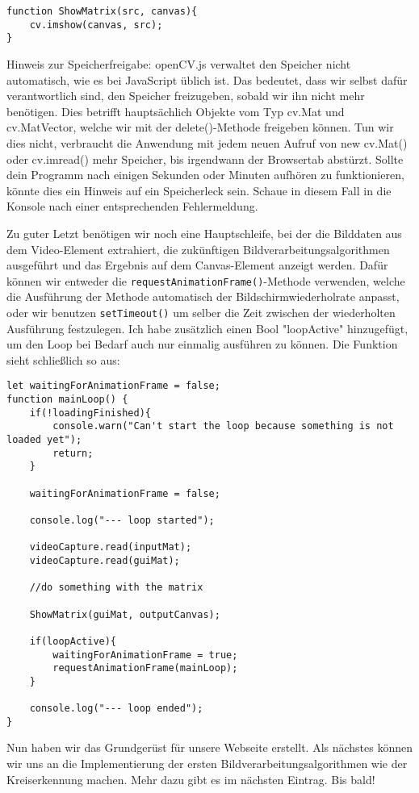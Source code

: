 \begin{lstlisting}[style=JavaScript]
function ShowMatrix(src, canvas){
    cv.imshow(canvas, src);
}
\end{lstlisting}

Hinweis zur Speicherfreigabe: openCV.js verwaltet den Speicher nicht automatisch, wie es bei JavaScript üblich ist. Das bedeutet, dass wir selbst dafür verantwortlich sind, den Speicher freizugeben, sobald wir ihn nicht mehr benötigen. Dies betrifft hauptsächlich Objekte vom Typ cv.Mat und cv.MatVector, welche wir mit der delete()-Methode freigeben können. Tun wir dies nicht, verbraucht die Anwendung mit jedem neuen Aufruf von new cv.Mat() oder cv.imread() mehr Speicher, bis irgendwann der Browsertab abstürzt. Sollte dein Programm nach einigen Sekunden oder Minuten aufhören zu funktionieren, könnte dies ein Hinweis auf ein Speicherleck sein. Schaue in diesem Fall in die Konsole nach einer entsprechenden Fehlermeldung.

Zu guter Letzt benötigen wir noch eine Hauptschleife, bei der die Bilddaten aus dem Video-Element extrahiert, die zukünftigen Bildverarbeitungsalgorithmen ausgeführt und das Ergebnis auf dem Canvas-Element anzeigt werden. Dafür können wir entweder die \texttt{requestAnimationFrame()}-Methode verwenden, welche die Ausführung der Methode automatisch der Bildschirmwiederholrate anpasst, oder wir benutzen \texttt{setTimeout()} um selber die Zeit zwischen der wiederholten Ausführung festzulegen. Ich habe zusätzlich einen Bool "loopActive" hinzugefügt, um den Loop bei Bedarf auch nur einmalig ausführen zu können. Die Funktion sieht schließlich so aus:

\begin{lstlisting}[style=JavaScript]
let waitingForAnimationFrame = false;
function mainLoop() {
    if(!loadingFinished){
        console.warn("Can't start the loop because something is not loaded yet");
        return;
    }

    waitingForAnimationFrame = false;

    console.log("--- loop started");

    videoCapture.read(inputMat);
    videoCapture.read(guiMat);

    //do something with the matrix
    
    ShowMatrix(guiMat, outputCanvas);

    if(loopActive){
        waitingForAnimationFrame = true;
        requestAnimationFrame(mainLoop);
    }

    console.log("--- loop ended");
}
\end{lstlisting}

Nun haben wir das Grundgerüst für unsere Webseite erstellt. Als nächstes können wir uns an die Implementierung der ersten Bildverarbeitungsalgorithmen wie der Kreiserkennung machen. Mehr dazu gibt es im nächsten Eintrag. Bis bald!
